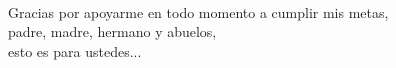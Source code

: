 
\begin{dedicatoria} 
\\[14\baselineskip]
Gracias por apoyarme en todo momento a cumplir mis metas,\\padre, madre, hermano y abuelos,\\esto es para ustedes...

\end{dedicatoria}
